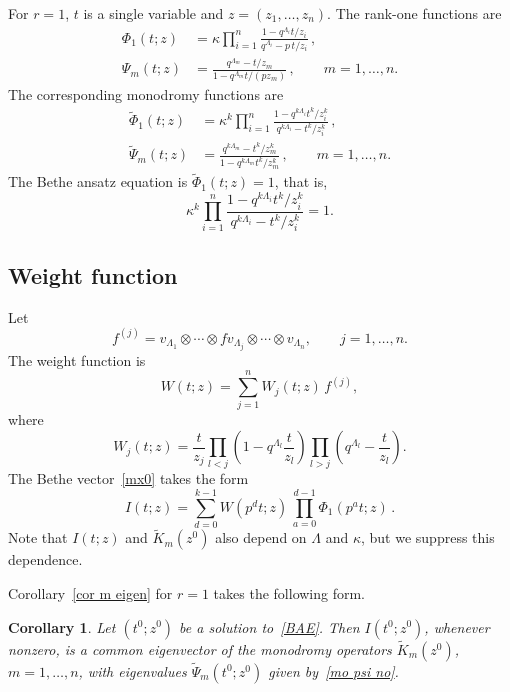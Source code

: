 \documentclass[12pt]{amsart}
\newtheorem{cor}[thm]{Corollary}
\theoremstyle{definition} %
\numberwithin{equation}{section}
\theoremstyle{definition}
\let\ka\kappa
\let\La\Lambda
\begin{document}
For $r=1$, $t$ is a single variable and $z=(z_1,\dots,z_n)$.
The rank-one functions are
\begin{align}
\label{BPhi}
\Phi_1(t;z)
&=
\ka\prod_{i=1}^n
\frac{1-q^{\La_i}t/z_i}
     {q^{\La_i}-p\,t/z_i}\,,
\\[4pt]
\label{BPsi}
\Psi_m(t;z)
&=
\frac{q^{\La_m}-t/z_m}
     {1-q^{\La_m}t/(p z_m)}\,,
\qquad m=1,\dots,n.
\end{align}
The corresponding monodromy functions are
\begin{align}
\label{mo phi no}
\tilde\Phi_1(t;z)
&=
\ka^k\prod_{i=1}^n
\frac{1-q^{k\La_i}t^k/z_i^k}
     {q^{k\La_i}-t^k/z_i^k}\,,
\\[4pt]
\label{mo psi no}
\tilde\Psi_m(t;z)
&=
\frac{q^{k\La_m}-t^k/z_m^k}
     {1-q^{k\La_m}t^k/z_m^k}\,,
\qquad m=1,\dots,n.
\end{align}
The Bethe ansatz equation is $\tilde\Phi_1(t;z)=1$, that is,
\begin{equation}
\label{BAE}
\ka^k\prod_{i=1}^n
\frac{1-q^{k\La_i}t^k/z_i^k}
     {q^{k\La_i}-t^k/z_i^k}
=1.
\end{equation}

\subsection{Weight function}

Let
\[
f^{(j)}
=
v_{\La_1}\otimes\cdots\otimes
fv_{\La_j}\otimes\cdots\otimes v_{\La_n},
\qquad j=1,\dots,n.
\]
The weight function is
\begin{equation}
\label{BW1}
W(t;z)=\sum_{j=1}^n W_j(t;z)\,f^{(j)},
\end{equation}
where
\begin{equation}
\label{BW2}
W_j(t;z)
=
\frac{t}{z_j}
\prod_{l<j}\!\left(1-q^{\La_l}\frac{t}{z_l}\right)
\prod_{l>j}\!\left(q^{\La_l}-\frac{t}{z_l}\right).
\end{equation}
The Bethe vector~\eqref{mx0} takes the form
\begin{equation}
\label{mx1}
I(t;z)
=
\sum_{d=0}^{k-1}
W(p^d t;z)\,
\prod_{a=0}^{d-1}\Phi_1(p^a t;z)\,.
\end{equation}
Note that $I(t;z)$ and $\widetilde K_m(z^0)$ also depend on $\La$
and $\ka$, but we suppress this dependence.

Corollary~\ref{cor m eigen} for $r=1$ takes the following form.

\begin{cor}
\label{cor:r=1}
Let $(t^0;z^0)$ be a solution to~\eqref{BAE}. Then $I(t^0;z^0)$,
whenever nonzero, is a common eigenvector of the monodromy operators
$\widetilde K_m(z^0)$, $m=1,\dots,n$, with eigenvalues
$\widetilde\Psi_m(t^0;z^0)$ given by~\eqref{mo psi no}.
\end{cor}
\end{document}
